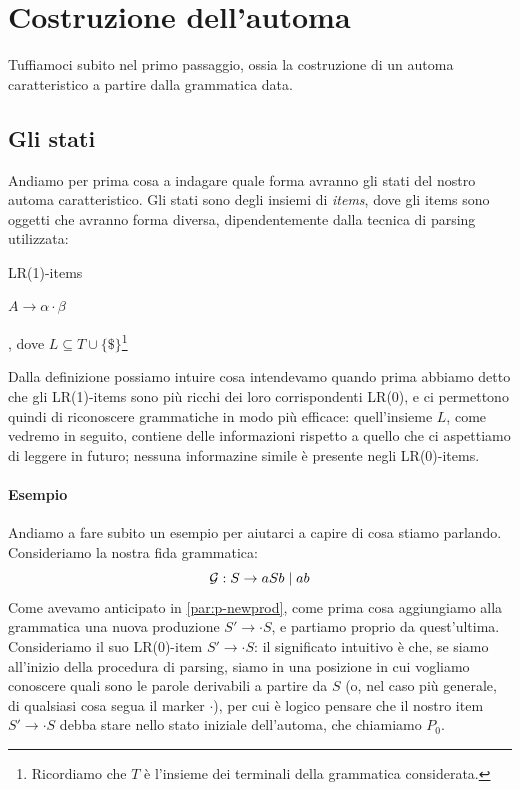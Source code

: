 \documentclass[class=book, crop=false, oneside, 12pt]{standalone}
\begin{document}
\section{Costruzione dell'automa}
Tuffiamoci subito nel primo passaggio, ossia la costruzione di un automa caratteristico a partire dalla grammatica data.

\subsection{Gli stati}
Andiamo per prima cosa a indagare quale forma avranno gli stati del nostro automa caratteristico. Gli stati sono degli insiemi di \emph{items}, dove gli items sono oggetti che avranno forma diversa, dipendentemente dalla tecnica di parsing utilizzata:
\begin{labeling}{LR(1)-items}
    \item[LR(0)-items] \(A \to \alpha \cdot \beta\)
    \item[LR(1)-items] [\(A \to \alpha \cdot \beta, L\)], dove \(L \subseteq T \cup \{\$\}\)\footnote{Ricordiamo che \(T\) è l'insieme dei terminali della grammatica considerata.}
\end{labeling}
Dalla definizione possiamo intuire cosa intendevamo quando prima abbiamo detto che gli LR(1)-items sono più ricchi dei loro corrispondenti LR(0), e ci permettono quindi di riconoscere grammatiche in modo più efficace: quell'insieme \(L\), come vedremo in seguito, contiene delle informazioni rispetto a quello che ci aspettiamo di leggere in futuro; nessuna informazine simile è presente negli LR(0)-items.

\paragraph{Esempio}
Andiamo a fare subito un esempio per aiutarci a capire di cosa stiamo parlando. Consideriamo la nostra fida grammatica:
\begin{equation}
    \label{eq:balanced}
    \mathcal{G}: S \to aSb \mid ab
\end{equation}
Come avevamo anticipato in \ref{par:p-newprod}, come prima cosa aggiungiamo alla grammatica una nuova produzione \(S' \to \cdot S\), e partiamo proprio da quest'ultima. Consideriamo il suo LR(0)-item \(S' \to \cdot S\): il significato intuitivo è che, se siamo all'inizio della procedura di parsing, siamo in una posizione in cui vogliamo conoscere quali sono le parole derivabili a partire da \(S\) (o, nel caso più generale, di qualsiasi cosa segua il marker \(\cdot\)), per cui è logico pensare che il nostro item \(S' \to \cdot S\) debba stare nello stato iniziale dell'automa, che chiamiamo \(P_0\).
\end{document}
